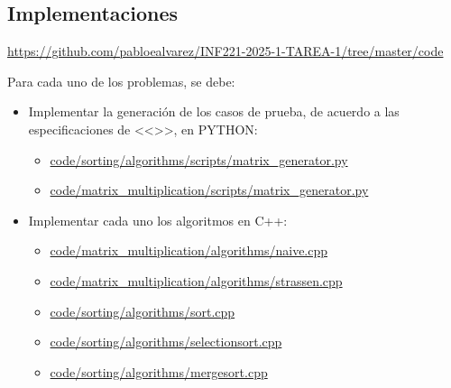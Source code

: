 
\subsection{Implementaciones}

\begin{mdframed}

    \begin{center}
    
    \url{https://github.com/pabloealvarez/INF221-2025-1-TAREA-1/tree/master/code}
        
\end{center}
\end{mdframed}

Para cada uno de los problemas, se debe:
\begin{itemize}
    \item Implementar la generación de los casos de prueba, de acuerdo a las especificaciones de <<>>, en PYTHON: 
    \begin{itemize}
        \item \href{https://github.com/pabloealvarez/INF221-2025-1-TAREA-1/blob/master/code/sorting/scripts/array_generator.py}{code/sorting/algorithms/scripts/matrix\_generator.py}
        \item \href{https://github.com/pabloealvarez/INF221-2025-1-TAREA-1/blob/master/code/matrix_multiplication/scripts/matrix_generator.py}{code/matrix\_multiplication/scripts/matrix\_generator.py}
    \end{itemize}
    \item Implementar cada uno los algoritmos en C++:
    \begin{itemize}
        \item \href{https://github.com/pabloealvarez/INF221-2025-1-TAREA-1/blob/master/code/matrix_multiplication/algorithms/naive.cpp}{code/matrix\_multiplication/algorithms/naive.cpp}
        \item \href{https://github.com/pabloealvarez/INF221-2025-1-TAREA-1/blob/master/code/matrix_multiplication/algorithms/strassen.cpp}{code/matrix\_multiplication/algorithms/strassen.cpp}
        \item \href{https://github.com/pabloealvarez/INF221-2025-1-TAREA-1/blob/master/code/sorting/algorithms/sort.cpp}{code/sorting/algorithms/sort.cpp}
        \item \href{https://github.com/pabloealvarez/INF221-2025-1-TAREA-1/blob/master/code/sorting/algorithms/selectionsort.cpp}{code/sorting/algorithms/selectionsort.cpp}
        \item \href{https://github.com/pabloealvarez/INF221-2025-1-TAREA-1/blob/master/code/sorting/algorithms/mergesort.cpp}{code/sorting/algorithms/mergesort.cpp}

\end{itemize}
\end{itemize}
